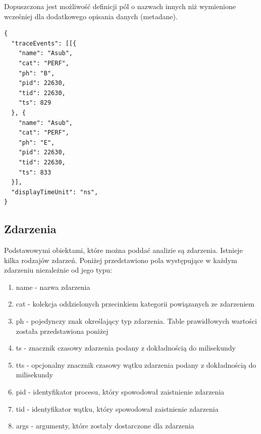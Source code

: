 \documentclass[polish, twoside, 12pt]{mwart}
\begin{document}
Dopuszczona jest możliwość definicji pól o nazwach innych niż wymienione wcześniej dla dodatkowego opisania danych (metadane).

\begin{lstlisting}[caption=Przykładowy wariant obiektowy]
{
  "traceEvents": [[{
    "name": "Asub",
    "cat": "PERF",
    "ph": "B",
    "pid": 22630,
    "tid": 22630,
    "ts": 829
  }, {
    "name": "Asub",
    "cat": "PERF",
    "ph": "E",
    "pid": 22630,
    "tid": 22630,
    "ts": 833
  }],
  "displayTimeUnit": "ns",
}
\end{lstlisting}

\subsection{Zdarzenia}

Podstawowymi obiektami, które można poddać analizie są zdarzenia. Istnieje kilka rodzajów zdarzeń. Poniżej przedstawiono pola występujące w każdym zdarzeniu niezależnie od jego typu:

\begin{enumerate}
  \item name - nazwa zdarzenia
  \item cat - kolekcja oddzielonych przecinkiem kategorii powiązanych ze zdarzeniem
  \item ph - pojedynczy znak określający typ zdarzenia. Table prawidłowych wartości została przedstawiona poniżej
  \item ts - znacznik czasowy zdarzenia podany z dokładnością do milisekundy
  \item tts - opcjonalny znacznik czasowy wątku zdarzenia podany z dokładnością do milisekundy
  \item pid - identyfikator procesu, który spowodował zaistnienie zdarzenia
  \item tid - identyfikator wątku, który spowodował zaistnienie zdarzenia
  \item args - argumenty, które zostały dostarczone dla zdarzenia
\end{enumerate}
\end{document}
